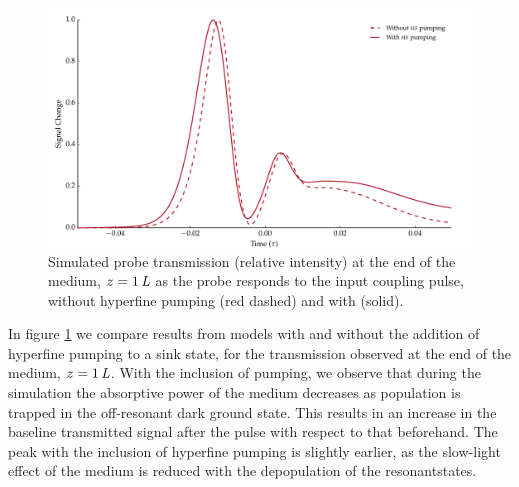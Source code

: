     \begin{figure}[]
      \includegraphics[width=\linewidth]{figs/06_simultons/mb_vee2g_exp_build_plot_1_2_fig1.pdf}
      \caption{
      Simulated probe transmission (relative intensity) at the end of the
      medium, $z=\unit[1]{\textit{L}}$ as the probe responds to the input
      coupling pulse, without hyperfine pumping (red dashed) and with (solid).
      }
      \label{fig:hf_pumping} 
    \end{figure}

    In figure \ref{fig:hf_pumping} we compare results from models with and
    without the addition of hyperfine pumping to a sink state, for the
    transmission observed at the end of the medium, $z=\unit[1]{\textit{L}}$.
    With the inclusion of pumping, we observe that during the simulation the
    absorptive power of the medium decreases as population is trapped in the
    off-resonant dark ground state. This results in an increase in the baseline
    transmitted signal after the pulse with respect to that beforehand. The peak
    with the inclusion of hyperfine pumping is slightly earlier, as the 
    slow-light effect of the medium is reduced with the depopulation of the
    resonantstates.
